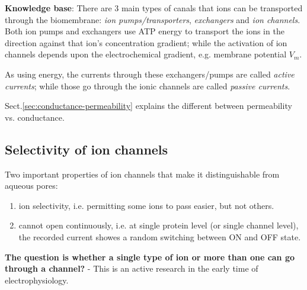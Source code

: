 \begin{mdframed}
  {\bf Knowledge base}: There are 3 main types of canals that ions can
  be transported through the biomembrane:
  {\it ion pumps/transporters}, {\it exchangers} and
  {\it ion channels}.  Both ion pumps and exchangers use ATP energy to
  transport the ions in the direction against that ion's concentration
  gradient; while the activation of ion channels depends upon the
  electrochemical gradient, e.g. membrane potential $V_m$. 
  
  As using energy, the currents through these exchangers/pumps are called {\it
  active currents}; while those go through the ionic channels are called {\it
  passive currents}.
\end{mdframed}

Sect.\ref{sec:conductance-permeability} explains the different between
permeability vs. conductance.

\subsection{Selectivity of ion channels}
\label{sec:selectivity-ion-channel}

Two important properties of ion channels that make it distinguishable
from aqueous pores:

\begin{enumerate}
  \item ion selectivity, i.e. permitting some ions to pass easier, but not
    others.

  \item cannot open continuously, i.e. at single protein level (or single
  channel level), the recorded current showes a random switching between ON and
  OFF state.

\end{enumerate}

{\bf The question is whether a single type of ion or more than one can
  go through a channel?}
- This is an active research in the early time of electrophysiology.

